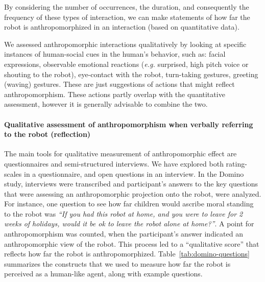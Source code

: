 \documentclass{frontiersSCNS} %
\newcommand{\eg}{\textit{e.g.}\xspace}
\begin{document}
By considering the number of occurrences, the duration, and consequently the
frequency of these types of interaction, we can make statements of how far the
robot is anthropomorphized in an interaction (based on quantitative data).

We assessed anthropomorphic interactions qualitatively by looking at specific
instances of human-social cues in the human's behavior, such as: facial
expressions, observable emotional reactions (\eg surprised, high pitch voice or
shouting to the robot), eye-contact with the robot, turn-taking gestures,
greeting (waving) gestures. These are just suggestions of actions that might
reflect anthropomorphism. These actions partly overlap with the quantitative
assessment, however it is generally advisable to combine the two.


\paragraph{Qualitative assessment of anthropomorphism when verbally referring to
the robot (reflection)\\}

The main tools for qualitative measurement of anthropomorphic effect are
questionnaires and semi-structured interviews. We have explored both
rating-scales in a questionnaire, and open questions in an interview.  In the
Domino study, interviews were transcribed and participant's answers to the key
questions that were assessing an anthropomorphic projection onto the robot, were
analyzed. For instance, one question to see how far children would ascribe moral
standing to the robot was \emph{``If you had this robot at home, and you were to
leave for 2 weeks of holidays, would it be ok to leave the robot alone at
home?''}. A point for anthropomorphism was counted, when the participant's
answer indicated an anthropomorphic view of the robot. This process led to a
``qualitative score'' that reflects how far the robot is anthropomorphized.
Table~\ref{tab:domino-questions} summarizes the constructs that we used to
measure how far the robot is perceived as a human-like agent, along with example
questions.
\end{document}
